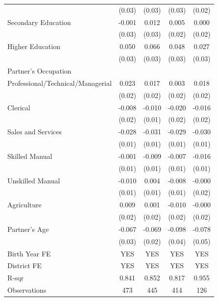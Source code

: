 \begin{longtable}{l*{4}{c}}
                    & (0.03) & (0.03) & (0.03) & (0.02) \\
\hspace{1em}Secondary Education & -0.001 & 0.012 & 0.005 & 0.000 \\
                    & (0.03) & (0.03) & (0.02) & (0.02) \\
\hspace{1em}Higher Education & 0.050\sym{*} & 0.066\sym{**} & 0.048\sym{*} & 0.027 \\
                    & (0.03) & (0.03) & (0.03) & (0.03) \\
\multicolumn{5}{l}{Partner's Occupation} \\
\hspace{1em}Professional/Technical/Managerial & 0.023 & 0.017 & 0.003 & 0.018 \\
                    & (0.02) & (0.02) & (0.02) & (0.02) \\
\hspace{1em}Clerical & -0.008 & -0.010 & -0.020 & -0.016 \\
                    & (0.02) & (0.01) & (0.02) & (0.02) \\
\hspace{1em}Sales and Services & -0.028\sym{**} & -0.031\sym{**} & -0.029\sym{**} & -0.030\sym{**} \\
                    & (0.01) & (0.01) & (0.01) & (0.01) \\
\hspace{1em}Skilled Manual & -0.001 & -0.009 & -0.007 & -0.016 \\
                    & (0.01) & (0.01) & (0.01) & (0.01) \\
\hspace{1em}Unskilled Manual & -0.010 & 0.004 & -0.008 & -0.000 \\
                    & (0.01) & (0.01) & (0.01) & (0.02) \\
\hspace{1em}Agriculture & 0.009 & 0.001 & -0.010 & -0.000 \\
                    & (0.02) & (0.02) & (0.02) & (0.02) \\
Partner's Age & -0.067\sym{*} & -0.069\sym{***} & -0.098\sym{***} & -0.078 \\
                    & (0.03) & (0.02) & (0.04) & (0.05) \\
\hline
Birth Year FE & YES & YES & YES & YES \\
District FE & YES & YES & YES & YES \\
R-sqr & 0.841 & 0.852 & 0.817 & 0.955 \\
Observations & 473 & 445 & 414 & 126 \\
\hline \hline

\end{longtable}